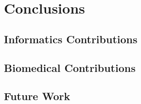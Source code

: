 \chapter{Conclusions}
\section{Informatics Contributions}

\section{Biomedical Contributions}

\section{Future Work}


